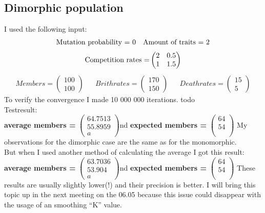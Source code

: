 \documentclass{article}
\newcommand{\vect}[3]{\ensuremath{\begin{pmatrix}	#1 \\ #2 \\ #3	\end{pmatrix}}}
\begin{document}
\subsection{Dimorphic population}
I used the following input:
\begin{align*}
\textnormal{Mutation probability = 0}
&&\textnormal{Amount of traits = 2}
\end{align*}
\[\textnormal{Competition rates =} 
\begin{pmatrix}	2 & 0.5 \\ 1 & 1.5 \end{pmatrix}\]
\begin{align*}
	Members = \begin{pmatrix}	100 \\ 100	\end{pmatrix} && Brithrates = \begin{pmatrix}	170 \\ 150	\end{pmatrix} && Deathrates = \begin{pmatrix}	15 \\ 5	\end{pmatrix}
\end{align*}
To verify the convergence I made 10 000 000 iterations. todo\\
Testresult:\\
\textbf{average members = } \vect{64.7513}{55.8959} and \textbf{expected members = } \vect{64}{54}\\
My observations for the dimorphic case are the same as for the monomorphic. \\
But when I used another method of calculating the average I got this result:\\
\textbf{average members = } \vect{63.7036}{53.904} and \textbf{expected members = } \vect{64}{54}\\
These results are usually slightly lower(!) and their precision is better. I will bring this topic up in the next meeting on the 06.05 because this issue could disappear with the usage of an smoothing "`K"' value.
\end{document}
